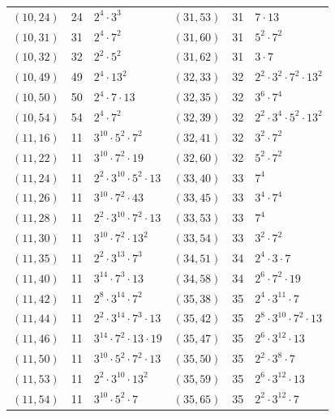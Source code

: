 \documentclass[11pt]{article}
\begin{document}
\begin{longtable}{@{}lrl@{\qquad}lrl@{}}
$(10,24)$ & 24 & $2^{4}\cdot 3^{3}$ & $(31,53)$ & 31 & $7\cdot 13$\\
$(10,31)$ & 31 & $2^{4}\cdot 7^{2}$ & $(31,60)$ & 31 & $5^{2}\cdot 7^{2}$\\
$(10,32)$ & 32 & $2^{2}\cdot 5^{2}$ & $(31,62)$ & 31 & $3\cdot 7$\\
$(10,49)$ & 49 & $2^{4}\cdot 13^{2}$ & $(32,33)$ & 32 & $2^{2}\cdot 3^{2}\cdot 7^{2}\cdot 13^{2}$\\
$(10,50)$ & 50 & $2^{4}\cdot 7\cdot 13$ & $(32,35)$ & 32 & $3^{6}\cdot 7^{4}$\\
$(10,54)$ & 54 & $2^{4}\cdot 7^{2}$ & $(32,39)$ & 32 & $2^{2}\cdot 3^{4}\cdot 5^{2}\cdot 13^{2}$\\
$(11,16)$ & 11 & $3^{10}\cdot 5^{2}\cdot 7^{2}$ & $(32,41)$ & 32 & $3^{2}\cdot 7^{2}$\\
$(11,22)$ & 11 & $3^{10}\cdot 7^{2}\cdot 19$ & $(32,60)$ & 32 & $5^{2}\cdot 7^{2}$\\
$(11,24)$ & 11 & $2^{2}\cdot 3^{10}\cdot 5^{2}\cdot 13$ & $(33,40)$ & 33 & $7^{4}$\\
$(11,26)$ & 11 & $3^{10}\cdot 7^{2}\cdot 43$ & $(33,45)$ & 33 & $3^{4}\cdot 7^{4}$\\
$(11,28)$ & 11 & $2^{2}\cdot 3^{10}\cdot 7^{2}\cdot 13$ & $(33,53)$ & 33 & $7^{4}$\\
$(11,30)$ & 11 & $3^{10}\cdot 7^{2}\cdot 13^{2}$ & $(33,54)$ & 33 & $3^{2}\cdot 7^{2}$\\
$(11,35)$ & 11 & $2^{2}\cdot 3^{13}\cdot 7^{3}$ & $(34,51)$ & 34 & $2^{4}\cdot 3\cdot 7$\\
$(11,40)$ & 11 & $3^{14}\cdot 7^{3}\cdot 13$ & $(34,58)$ & 34 & $2^{6}\cdot 7^{2}\cdot 19$\\
$(11,42)$ & 11 & $2^{8}\cdot 3^{14}\cdot 7^{2}$ & $(35,38)$ & 35 & $2^{4}\cdot 3^{11}\cdot 7$\\
$(11,44)$ & 11 & $2^{2}\cdot 3^{14}\cdot 7^{3}\cdot 13$ & $(35,42)$ & 35 & $2^{8}\cdot 3^{10}\cdot 7^{2}\cdot 13$\\
$(11,46)$ & 11 & $3^{14}\cdot 7^{2}\cdot 13\cdot 19$ & $(35,47)$ & 35 & $2^{6}\cdot 3^{12}\cdot 13$\\
$(11,50)$ & 11 & $3^{10}\cdot 5^{2}\cdot 7^{2}\cdot 13$ & $(35,50)$ & 35 & $2^{2}\cdot 3^{8}\cdot 7$\\
$(11,53)$ & 11 & $2^{2}\cdot 3^{10}\cdot 13^{2}$ & $(35,59)$ & 35 & $2^{6}\cdot 3^{12}\cdot 13$\\
$(11,54)$ & 11 & $3^{10}\cdot 5^{2}\cdot 7$ & $(35,65)$ & 35 & $2^{2}\cdot 3^{12}\cdot 7$\\

\end{longtable}
\end{document}
